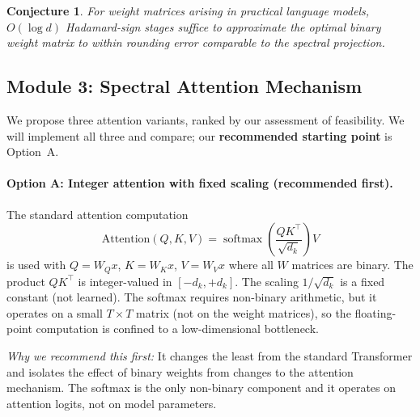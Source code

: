 \documentclass[12pt,a4paper]{article}
\theoremstyle{plain}
\newtheorem{conjecture}[theorem]{Conjecture}
\theoremstyle{definition}
\theoremstyle{remark}
\DeclareMathOperator{\softmax}{softmax}
\begin{document}
\begin{conjecture}\label{conj:log-stages}
For weight matrices arising in practical language models, $O(\log d)$ Hadamard-sign stages suffice to approximate the optimal binary weight matrix to within rounding error comparable to the spectral projection.
\end{conjecture}


\subsection{Module 3: Spectral Attention Mechanism}\label{sec:spectral-attention}

We propose three attention variants, ranked by our assessment of feasibility. We will implement all three and compare; our \textbf{recommended starting point} is Option~A.

\paragraph{Option A: Integer attention with fixed scaling (recommended first).}
The standard attention computation
\begin{equation}\label{eq:attention}
    \text{Attention}(Q, K, V) = \softmax\!\left(\frac{Q K^\top}{\sqrt{d_k}}\right) V
\end{equation}
is used with $Q = W_Q x$, $K = W_K x$, $V = W_V x$ where all $W$ matrices are binary. The product $QK^\top$ is integer-valued in $[-d_k, +d_k]$. The scaling $1/\sqrt{d_k}$ is a fixed constant (not learned). The softmax requires non-binary arithmetic, but it operates on a small $T \times T$ matrix (not on the weight matrices), so the floating-point computation is confined to a low-dimensional bottleneck.

\emph{Why we recommend this first:} It changes the least from the standard Transformer and isolates the effect of binary weights from changes to the attention mechanism. The softmax is the only non-binary component and it operates on attention logits, not on model parameters.
\end{document}
